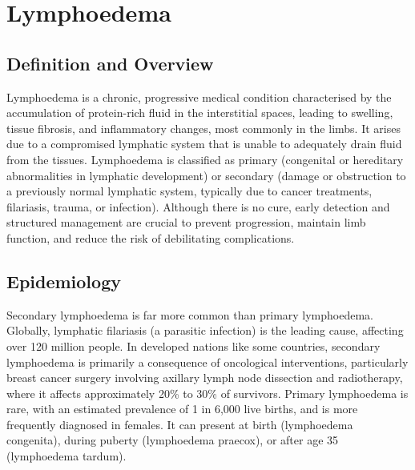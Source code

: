 \chapter{Lymphoedema}

\section*{Definition and Overview}
Lymphoedema is a chronic, progressive medical condition characterised by the accumulation of protein-rich fluid in the interstitial spaces, leading to swelling, tissue fibrosis, and inflammatory changes, most commonly in the limbs. It arises due to a compromised lymphatic system that is unable to adequately drain fluid from the tissues. Lymphoedema is classified as primary (congenital or hereditary abnormalities in lymphatic development) or secondary (damage or obstruction to a previously normal lymphatic system, typically due to cancer treatments, filariasis, trauma, or infection). Although there is no cure, early detection and structured management are crucial to prevent progression, maintain limb function, and reduce the risk of debilitating complications.

\section*{Epidemiology}
Secondary lymphoedema is far more common than primary lymphoedema. Globally, lymphatic filariasis (a parasitic infection) is the leading cause, affecting over 120 million people. In developed nations like some countries, secondary lymphoedema is primarily a consequence of oncological interventions, particularly breast cancer surgery involving axillary lymph node dissection and radiotherapy, where it affects approximately 20\% to 30\% of survivors. Primary lymphoedema is rare, with an estimated prevalence of 1 in 6,000 live births, and is more frequently diagnosed in females. It can present at birth (lymphoedema congenita), during puberty (lymphoedema praecox), or after age 35 (lymphoedema tardum).

